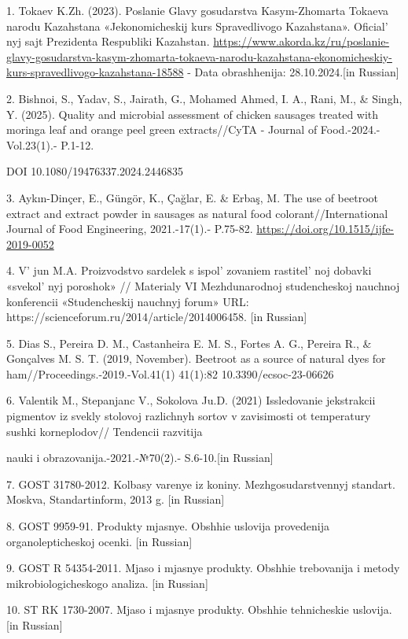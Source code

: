 \begin{references}
1. Tokaev K.Zh. (2023). Poslanie Glavy gosudarstva Kasym-Zhomarta
Tokaeva narodu Kazahstana «Jekonomicheskij kurs Spravedlivogo
Kazahstana». Oficial' nyj sajt Prezidenta Respubliki
Kazahstan.
\url{https://www.akorda.kz/ru/poslanie-glavy-gosudarstva-kasym-zhomarta-tokaeva-narodu-kazahstana-ekonomicheskiy-kurs-spravedlivogo-kazahstana-18588}
- Data obrashhenija: 28.10.2024.{[}in Russian{]}

2. Bishnoi, S., Yadav, S., Jairath, G., Mohamed Ahmed, I. A., Rani, M.,
\& Singh, Y. (2025). Quality and microbial assessment of chicken
sausages treated with moringa leaf and orange peel green extracts//CyTA
- Journal of Food.-2024.-Vol.23(1).- P.1-12.

DOI 10.1080/19476337.2024.2446835

3. Aykın-Dinçer, E., Güngör, K., Çağlar, E. \& Erbaş, M. The use of
beetroot extract and extract powder in sausages as natural food
colorant//International Journal of Food Engineering, 2021.-17(1).-
P.75-82. \url{https://doi.org/10.1515/ijfe-2019-0052}{}

4. V' jun M.A. Proizvodstvo sardelek s
ispol' zovaniem rastitel' noj dobavki
«svekol' nyj poroshok» // Materialy VI Mezhdunarodnoj
studencheskoj nauchnoj konferencii «Studencheskij nauchnyj forum» URL:
https://scienceforum.ru/2014/article/2014006458. {[}in Russian{]}

5. Dias S., Pereira D. M., Castanheira E. M. S., Fortes A. G., Pereira
R., \& Gonçalves M. S. T. (2019, November). Beetroot as a source of
natural dyes for ham//Proceedings.-2019.-Vol.41(1) 41(1):82
10.3390/ecsoc-23-06626

6. Valentik M., Stepanjanc V., Sokolova Ju.D. (2021) Issledovanie
jekstrakcii pigmentov iz svekly stolovoj razlichnyh sortov v zavisimosti
ot temperatury sushki korneplodov// Tendencii razvitija

nauki i obrazovanija.-2021.-№70(2).- S.6-10.{[}in Russian{]}

7. GOST 31780-2012. Kolbasy varenye iz koniny. Mezhgosudarstvennyj
standart. Moskva, Standartinform, 2013 g. {[}in Russian{]}

8. GOST 9959-91. Produkty mjasnye. Obshhie uslovija provedenija
organolepticheskoj ocenki. {[}in Russian{]}

9. GOST R 54354-2011. Mjaso i mjasnye produkty. Obshhie trebovanija i
metody mikrobiologicheskogo analiza. {[}in Russian{]}

10. ST RK 1730-2007. Mjaso i mjasnye produkty. Obshhie tehnicheskie
uslovija. {[}in Russian{]}
\end{references}

